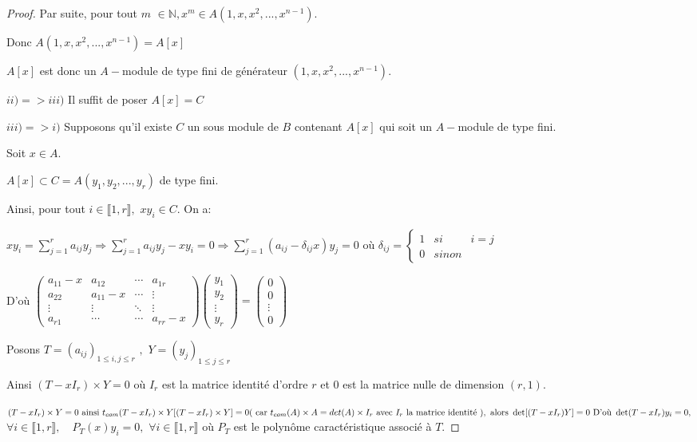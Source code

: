 \begin{proof}
	Par suite, pour tout $m$ $\in \mathbb{N},x^{m}\in A(1,x,x^{2},...,x^{n-1}).$
	
	Donc $A(1,x,x^{2},...,x^{n-1})=A[x]$
	
	$A[x]$ est donc un $A-$module de type fini de générateur $
	(1,x,x^{2},...,x^{n-1}).$
	
	$ii)=>iii)$ Il suffit de poser $A[x]=C$
	
	$iii)=>i)$ Supposons qu'il existe $C$ un sous module de $B$ contenant $A[x]$ qui soit un $A-$module de type fini.
	
	Soit $x\in A.$
	
	$A[x]\subset C=A(y_{1},y_{2},...,y_{r})$ de type fini.
	
	Ainsi, pour tout $i\in \llbracket 1, r \rrbracket ,$ $xy_{i}\in C.$ On
	a:
	
	$xy_{i}=\sum\limits_{j=1}^{r}a_{ij}y_{j}\Rightarrow
	\sum\limits_{j=1}^{r}a_{ij}y_{j}-xy_{i}=0\Rightarrow
	\sum\limits_{j=1}^{r}(a_{ij}-\delta _{ij}x)y_{j}=0$ où $\delta_{ij}=\left\{ 
	\begin{array}{ccc}
		1 & { si } & i=j \\ 
		0 & { sinon}
	\end{array}
	\right. $
	
	D'où $\left( 
	\begin{array}{cccc}
		a_{11}-x & a_{12} & \cdots & a_{1r} \\ 
		a_{22} & a_{11}-x & \cdots& \vdots\\ 
		\vdots & \vdots& \ddots  & \vdots\\ 
		a_{r1} & \cdots & \cdots & a_{rr}-x
	\end{array}
	\right) \left( 
	\begin{array}{c}
		y_{1} \\ 
		y_{2} \\ 
		\vdots \\ 
		y_{r}
	\end{array}
	\right) =\left( 
	\begin{array}{c}
		0 \\ 
		0 \\ 
		\vdots\\ 
		0
	\end{array}
	\right) $
	
	Posons $T=(a_{ij})_{1\leq i,j\leq r}$ $,$ $Y=(y_{j})_{1\leq j\leq r}$ 
	
	Ainsi $(T-xI_{r})\times Y=0$ où $I_{r}$ est la matrice identité d'ordre $r$ et $0$ est la matrice nulle de dimension $(r,1).$
	
	$(T-xI_{r})\times Y=0 \text{ ainsi } {t_{com}}(T-xI_{r})\times Y[(T-xI_{r})\times Y]=0 \\ (\text{ car } t_{com}(A) \times A = det(A) \times I_r \text{ avec } I_r \text{ la matrice identité }),	\text{ alors } \det [(T-xI_{r})Y]=0 \\
	\text{ D'où } \det(T-xI_{r})y_{i}=0,$ $\forall i\in \llbracket 1, r \rrbracket $$, \quad P_{T}(x)y_{i}=0,$ $\forall i\in \llbracket 1, r \rrbracket
	$ où $P_{T}$ est le polynôme caractéristique associé à $T.$
	

\end{proof}
